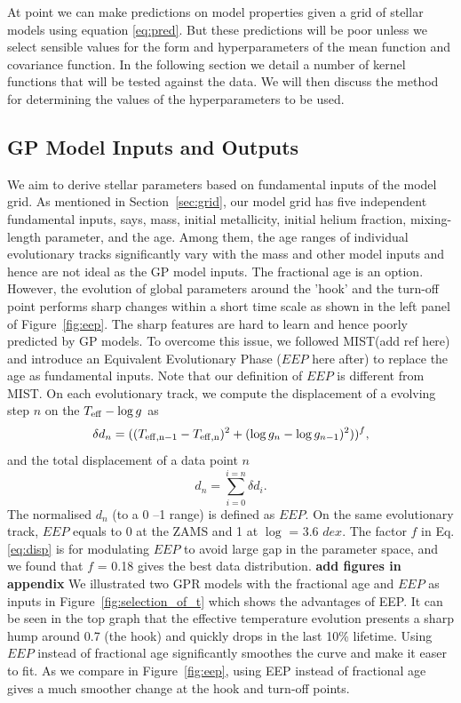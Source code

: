 At point we can make predictions on model properties given a grid of stellar models using equation \ref{eq:pred}.  But these predictions will be poor unless we select sensible values for the form and hyperparameters of the mean function and covariance function.  In the following section we detail a number of kernel functions that will be tested against the data.  We will then discuss the method for determining the values of the hyperparameters to be used.

\subsection{GP Model Inputs and Outputs}
We aim to derive stellar parameters based on fundamental inputs of the model grid. As mentioned in Section~\ref{sec:grid}, our model grid has five independent fundamental inputs, says, mass, initial metallicity, initial helium fraction, mixing-length parameter, and the age.
Among them, the age ranges of individual evolutionary tracks significantly vary with the mass and other model inputs and hence are not ideal as the GP model inputs. The fractional age is an option. However, the evolution of global parameters around the 'hook' and the turn-off point performs sharp changes within a short time scale as shown in the left panel of Figure~\ref{fig:eep}. The sharp features are hard to learn and hence poorly predicted by GP models. To overcome this issue, we followed MIST(add ref here) and introduce an Equivalent Evolutionary Phase ($EEP$ here after) to replace the age as fundamental inputs. Note that our definition of $EEP$ is different from MIST. 
%
On each evolutionary track, we compute the displacement of a evolving step $n$ on the  $T_{\rm eff} - \log g$ as 
\begin{equation}\label{eq:disp}
\delta d_{n} = ((T_{\rm eff, n-1} - T_{\rm eff, n}) ^{2} + (\log g _{n} - \log g_{n-1})^{2}))^{f},
\end{equation}
and the total displacement of a data point $n$ 
\begin{equation}
d_{n} = \sum_{i = 0}^{i = n} \delta d_{i} .
\end{equation}
The normalised $d_{n}$ (to a 0 --1 range) is defined as $EEP$. On the same evolutionary track, $EEP$ equals to 0 at the ZAMS and 1 at $\log$ = 3.6 $dex$. The factor $f$ in Eq. \ref{eq:disp} is for modulating $EEP$ to avoid large gap in the parameter space, and we found that $f$ = 0.18 gives the best data distribution. {\bf add figures in appendix}
%
We illustrated two GPR models with the fractional age and $EEP$ as inputs in Figure~\ref{fig:selection_of_t} which shows the advantages of EEP.
It can be seen in the top graph that the effective temperature evolution presents a sharp hump around 0.7 (the hook) and quickly drops in the last 10\% lifetime. Using $EEP$ instead of fractional age significantly smoothes the curve and make it easer to fit. As we compare in Figure~\ref{fig:eep}, using EEP instead of fractional age gives a much smoother change at the hook and turn-off points. 

